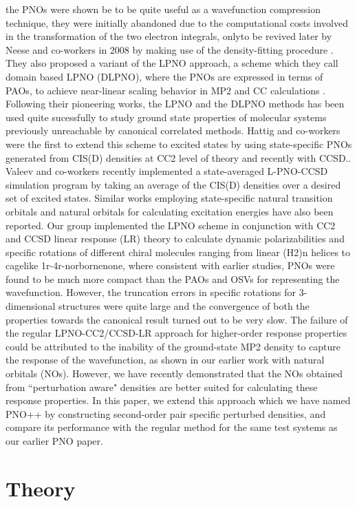 the PNOs were shown be to be quite useful as a wavefunction compression technique\cite{}, they were initially 
abandoned due to the computational costs involved in the transformation of the two electron 
integrals, onlyto be revived later by Neese and co-workers in 2008 by making use of the density-fitting procedure
\cite{}. They also proposed a variant of the LPNO approach, a scheme which they call domain based LPNO (DLPNO), 
where the PNOs are expressed in terms of PAOs, to achieve near-linear scaling behavior in MP2 and CC calculations
\cite{}. Following their pioneering works, the LPNO and the DLPNO methods has been used quite sucessfully to study 
ground state properties of molecular systems previously unreachable by canonical correlated methods\cite{}. 
\cite{} Hattig and co-workers were the first to extend this scheme to excited states by using state-specific 
PNOs generated from CIS(D) densities at CC2 level of theory\cite{} and recently with CCSD.\cite{}. Valeev and 
co-workers recently implemented a state-averaged L-PNO-CCSD simulation program by taking an average of the 
CIS(D) densities over a desired set of excited states\cite{}. Similar works employing state-specific natural 
transition orbitals and natural orbitals for calculating excitation energies have also been reported.
\cite{} Our group implemented the LPNO scheme in conjunction with CC2 and CCSD linear response (LR) theory  
to calculate dynamic polarizabilities and specific rotations of different chiral molecules ranging from linear
(H2)n helices to cagelike 1r-4r-norbornenone, where consistent with earlier studies, PNOs were found
to be much more compact than the PAOs and OSVs for representing the wavefunction. However, the truncation errors 
in specific rotations for 3-dimensional structures were quite large and the convergence of both the properties 
towards the canonical result turned out to be very slow\cite{}. The failure of the regular LPNO-CC2/CCSD-LR approach
for higher-order response properties could be attributed to the inability of the ground-state MP2 density to 
capture the response of the wavefunction, as shown in our earlier work with natural orbitals (NOs)\cite{}. However,
we have recently demonstrated that the NOs obtained from ``perturbation aware" densities are better suited
for calculating these response properties.\cite{} In this paper, we extend this approach which we have named 
PNO++ by constructing second-order pair specific perturbed densities, and compare its performance with 
the regular method for the same test systems as our earlier PNO paper.
\section{Theory}
